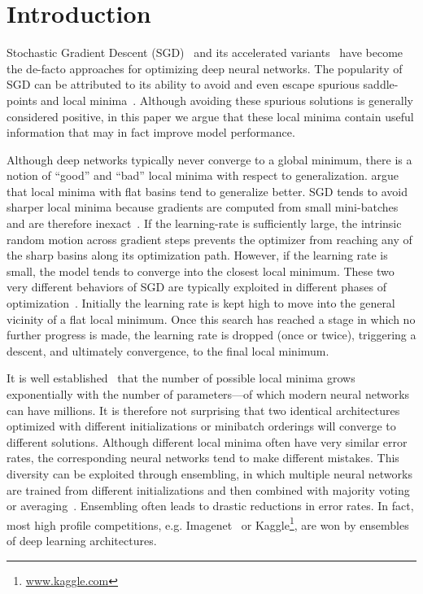 \section{Introduction}


Stochastic Gradient Descent (SGD)~\citep{bottou2010large} and its accelerated variants~\citep{kingma2014adam,duchi2011adaptive} have become the de-facto approaches for optimizing deep neural networks. The popularity of SGD can be attributed to its ability to avoid and even escape spurious saddle-points and local minima~\citep{dauphin2014identifying}.
Although avoiding these spurious solutions is generally considered positive,
in this paper we argue that these local minima contain useful information that may in fact improve model performance.

Although deep networks typically never converge to a global minimum, there is a notion of ``good'' and ``bad'' local minima with respect to generalization.  \citet{keskar2016large} argue that local minima with
flat basins tend to generalize better.
%
SGD tends to avoid sharper local minima because gradients are computed from small mini-batches and are therefore inexact~\citep{keskar2016large}. If the learning-rate is sufficiently large, the intrinsic random motion across gradient steps prevents the optimizer from reaching any of the sharp basins along its optimization path. However, if the learning rate is small, the model tends to converge into the closest local minimum. These two very different behaviors of SGD are typically exploited in different phases of optimization~\citep{he2016deep}. Initially the learning rate is kept high to move into the general vicinity of a flat local minimum. Once this search has reached a stage in which no further progress is made, the learning rate is dropped (once or twice), triggering a descent, and ultimately convergence, to the final local minimum.

It is well established~\citep{kawaguchi2016deep} that the number of possible local minima grows exponentially with the number of parameters---of which modern neural networks can have millions. It is therefore not surprising that two identical architectures optimized with different initializations or minibatch orderings will converge to different solutions.  Although different local minima often have very similar error rates, the corresponding neural networks tend to make different mistakes. This diversity can be exploited through ensembling, in which multiple neural networks are trained  from different initializations  and then combined  with majority voting or averaging~\citep{caruana2004ensemble}. Ensembling  often leads to drastic reductions  in error rates. In fact, most high profile competitions, e.g. Imagenet~\citep{deng2009imagenet} or Kaggle\footnote{\url{www.kaggle.com}}, are won by ensembles of deep learning architectures.

